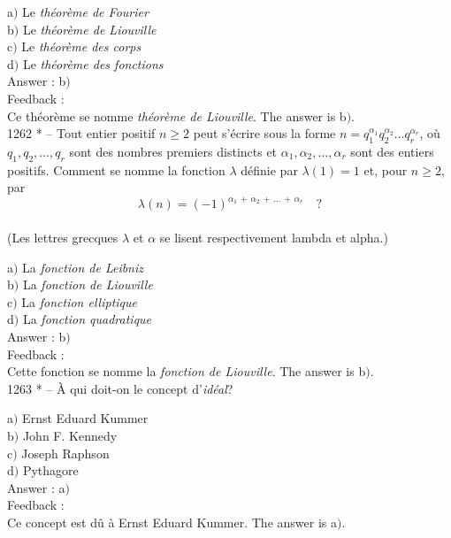 \documentclass[letterpaper, 12pt]{article}
\begin{document}
a$)$ Le {\sl th\'eor\`eme de Fourier} \\
b$)$ Le {\sl th\'eor\`eme de Liouville} \\
c$)$ Le {\sl th\'eor\`eme des corps} \\
d$)$ Le {\sl th\'eor\`eme des fonctions}\\

Answer : b$)$\\

Feedback : \\
Ce th\'eor\`eme se nomme {\sl th\'eor\`eme de Liouville}.
The answer is b$)$.\\

1262 * -- Tout entier positif $n\ge2$ peut s'\'ecrire sous la forme
$n=q_1^{\alpha_1}q_2^{\alpha_2}\ldots q_r^{\alpha_r}$, o\`u
$q_1,q_2,\ldots,q_r$ sont des nombres premiers distincts et
$\alpha_1,\alpha_2,\ldots,\alpha_r$ sont des entiers positifs.
Comment se nomme la fonction $\lambda$ d\'efinie par $\lambda(1)=1$
et, pour $n\ge2$, par
$$\lambda(n)=(-1)^{\alpha_1\,+\,\alpha_2\,+\,\ldots\,+\,\alpha_r}\quad?$$\\
(Les lettres grecques $\lambda$ et $\alpha$ se lisent respectivement
lambda et alpha.)

a$)$ La {\sl fonction de Leibniz} \\
b$)$ La {\sl fonction de Liouville} \\
c$)$ La {\sl fonction elliptique} \\
d$)$ La {\sl fonction quadratique}\\

Answer : b$)$\\

Feedback : \\
Cette fonction se nomme la {\sl fonction de Liouville}.
The answer is b$)$.\\

1263 * -- \`A qui doit-on le concept d'{\sl id\'eal}?

a$)$ Ernst Eduard Kummer \\
b$)$ John F. Kennedy \\
c$)$ Joseph Raphson \\
d$)$ Pythagore\\

Answer : a$)$\\

Feedback : \\
Ce concept est d\^u \`a Ernst Eduard Kummer.
The answer is a$)$.\\
\end{document}
